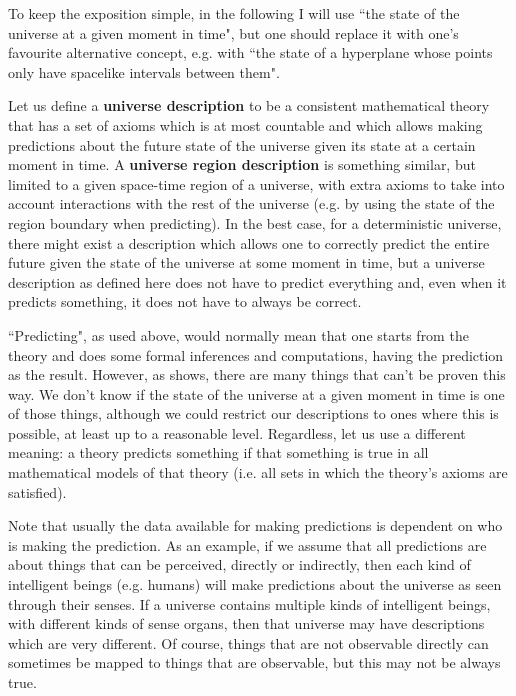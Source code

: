 \documentclass[a4paper
,draft
]{article}
\newcommand{\definitie}[1]{\textbf{#1}}
\newcommand{\ghilimele}[1]{``#1"}
\begin{document}
To keep the exposition simple, in the following I will use
\ghilimele{the state of the universe at a given moment in time},
but one should replace it with one's favourite alternative concept, e.g.
with \ghilimele{the state of a hyperplane whose points only have spacelike
intervals between them}.

Let us define a \definitie{universe description} to be a
consistent mathematical theory that has
a set of axioms which is at most countable and which allows making
predictions about the future state of the universe given its state
at a certain moment in time. A \definitie{universe region description}
is something similar, but limited to a given space-time region of a universe,
with extra axioms to take into account interactions with the rest of the
universe (e.g. by using the state of the region boundary when predicting).
In the best case, for a deterministic universe, there might exist
a description which allows one to correctly predict the entire future
given the state of the universe at some moment in time,
but a universe description
as defined here does not have to predict everything and,
even when it predicts something, it does not have to always be correct.

\ghilimele{Predicting}, as used above, would normally mean that one
starts from the theory and does some formal inferences and computations, having
the prediction as the result.
However, as \cite{Calude2013} shows, there are many
things that can't be proven this way.
We don't know if the state of the universe at a given moment in time is one of
those things, although we could restrict our descriptions to ones where this
is possible, at least up to a reasonable level.
Regardless, let us use a different meaning: a theory predicts something if
that something is true in all mathematical models of that theory (i.e. all
sets in which the theory's axioms are satisfied).

Note that usually the data available for making predictions is dependent
on who is making the prediction. As an example, if we assume that
all predictions are about things that can be perceived, directly or indirectly,
then
each kind of intelligent beings (e.g. humans) will make predictions
about the universe as seen through their senses. If a universe contains
multiple kinds of intelligent beings, with different kinds of
sense organs, then that universe may have descriptions which are
very different.
Of course, things that are not observable directly can sometimes be mapped
to things that are observable, but this may not be always true.
\end{document}
